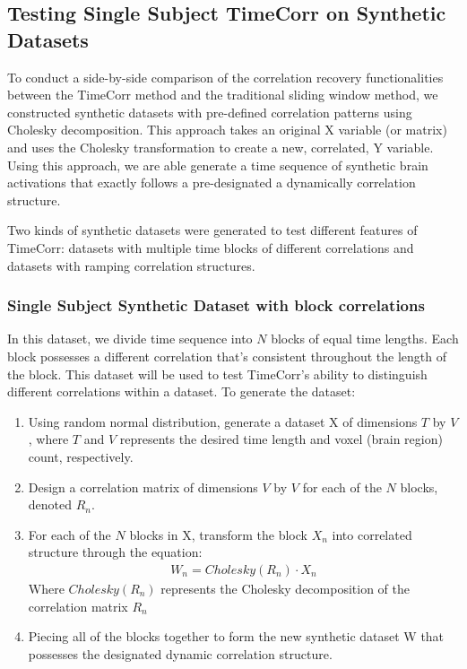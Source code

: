 \documentclass[11pt]{article}
\begin{document}
\subsection{Testing Single Subject TimeCorr on Synthetic Datasets}
To conduct a side-by-side comparison of the correlation recovery functionalities between the TimeCorr method and the traditional sliding window method, we constructed synthetic datasets with pre-defined correlation patterns using Cholesky decomposition. This approach takes an original X variable (or matrix) and uses the Cholesky transformation to create a new, correlated, Y variable. Using this approach, we are able generate a time sequence of synthetic brain activations that exactly follows a pre-designated a dynamically correlation structure.

Two kinds of synthetic datasets were generated to test different features of TimeCorr: datasets with multiple time blocks of different correlations and datasets with ramping correlation structures.

\subsubsection{Single Subject Synthetic Dataset with block correlations}

In this dataset, we divide time sequence into $N$ blocks of equal time lengths. Each block possesses a different correlation that's consistent throughout the length of the block. This dataset will be used to test TimeCorr's ability to distinguish different correlations within a dataset. To generate the dataset:
\begin{enumerate}
\item Using random normal distribution, generate a dataset X of dimensions $T$ by $V$, where $T$ and $V$ represents the desired time length and voxel (brain region) count, respectively.
\item Design a correlation matrix of dimensions $V$ by $V$ for each of the $N$ blocks, denoted $R_n$.
\item For each of the $N$ blocks in X, transform the block $X_n$ into correlated structure through the equation:
\begin{align*}
W_n = Cholesky(R_n) \cdot X_n
\end{align*}
Where $Cholesky(R_n)$ represents the Cholesky decomposition of the correlation matrix $R_n$
\item Piecing all of the blocks together to form the new synthetic dataset W that possesses the designated dynamic correlation structure.
\end{enumerate}
\end{document}
